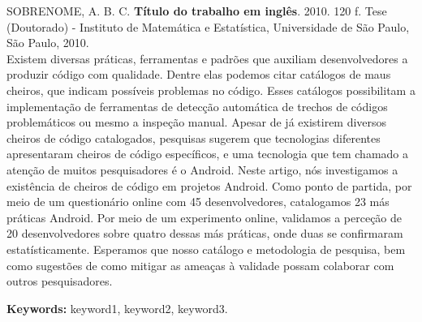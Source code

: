 \noindent SOBRENOME, A. B. C. \textbf{Título do trabalho em inglês}. 
2010. 120 f.
Tese (Doutorado) - Instituto de Matemática e Estatística,
Universidade de São Paulo, São Paulo, 2010.
\\

Existem diversas práticas, ferramentas e padrões que auxiliam desenvolvedores a produzir código com qualidade. Dentre elas podemos citar catálogos de maus cheiros, que indicam possíveis problemas no código. Esses catálogos possibilitam a implementação de ferramentas de detecção automática de trechos de códigos problemáticos ou mesmo a inspeção manual. Apesar de já existirem diversos cheiros de código catalogados, pesquisas sugerem que tecnologias diferentes apresentaram cheiros de código específicos, e uma tecnologia que tem chamado a atenção de muitos pesquisadores é o Android. Neste artigo, nós investigamos a existência de cheiros de código em projetos Android. Como ponto de partida, por meio de um questionário online com 45 desenvolvedores, catalogamos 23 más práticas Android. Por meio de um experimento online, validamos a perceção de 20 desenvolvedores sobre quatro dessas más práticas, onde duas se confirmaram estatísticamente. Esperamos que nosso catálogo e metodologia de pesquisa, bem como sugestões de como mitigar as ameaças à validade possam colaborar com outros pesquisadores.

\noindent \textbf{Keywords:} keyword1, keyword2, keyword3.

